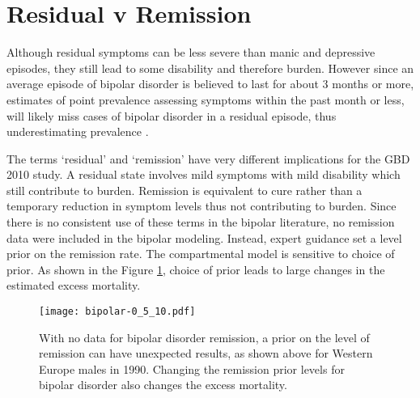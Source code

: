 \section{Residual v Remission}
Although residual symptoms can be less severe than manic and depressive episodes, they still lead to some disability and therefore burden.  However since an average episode of bipolar disorder is believed to last for about 3 months or more, estimates of point prevalence assessing symptoms within the past month or less, will likely miss cases of bipolar disorder in a residual episode, thus underestimating prevalence \cite{angst_historical_2000}.

The terms `residual' and `remission' have very different implications for the GBD 2010 study.  A residual state involves mild symptoms with mild disability which still contribute to burden. Remission is equivalent to cure rather than a temporary reduction in symptom levels thus not contributing to burden. Since there is no consistent use of these terms in the bipolar literature, no remission data were included in the bipolar modeling. Instead, expert guidance set a level prior on the remission rate.  The compartmental model is sensitive to choice of prior. As shown in the Figure \ref{fig:app-bipolar remission}, choice of prior leads to large changes in the estimated excess mortality.

    \begin{figure}[h]
        \begin{center}
            \texttt{[image: bipolar-0\_5\_10.pdf]}
            \caption{With no data for bipolar disorder remission, a prior on the level of remission can have unexpected results, as shown above for Western Europe males in 1990.  Changing the remission prior levels for bipolar disorder also changes the excess mortality.}
            \label{fig:app-bipolar remission}
        \end{center}
    \end{figure}

